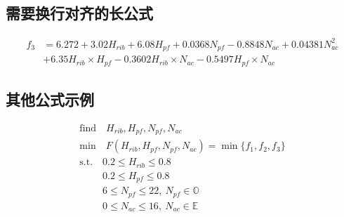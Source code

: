 \subsection{需要换行对齐的长公式}

\begin{equation}\label{eq:P}
    \begin{split}
        f_3 & = 6.272 + 3.02 H_{rib} + 6.08 H_{pf} + 0.0368 N_{pf} - 0.8848 N_{ac} + 0.04381 N_{ac}^2\\
        & + 6.35 H_{rib} \times H_{pf} - 0.3602 H_{rib}\times N_{ac} - 0.5497 H_{pf}\times N_{ac}
    \end{split}
\end{equation}

\subsection{其他公式示例}
\begin{equation}
    \begin{aligned}
        \text{find}\quad H_{rib}, H_{pf}, N_{pf}, N_{ac} \\
        \text{min}\quad F(H_{rib}, H_{pf}, N_{pf}, N_{ac}) = \min\{f_1, f_2, f_3\} \\
        \text{s.t.}\quad 0.2 \leqslant H_{rib} \leqslant 0.8 \\
        \phantom{\text{s.t.}\quad} 0.2 \leqslant H_{pf} \leqslant 0.8 \\
        \phantom{\text{s.t.}\quad} 6 \leqslant N_{pf} \leqslant 22,\ N_{pf} \in \mathbb{O} \\
        \phantom{\text{s.t.}\quad} 0 \leqslant N_{ac} \leqslant 16,\ N_{ac} \in \mathbb{E}
    \end{aligned}
    \label{eq:MO}
\end{equation}
